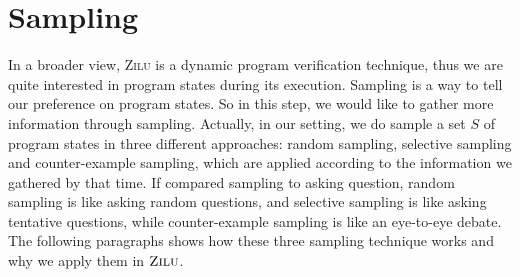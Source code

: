 
\section{Sampling} %
\label{sec:sampling}
In a broader view, \textsc{Zilu} is a dynamic program verification technique, 
thus we are quite interested in program states during its execution.
Sampling is a way to tell our preference on program states. 
So in this step, we would like to gather more information through sampling.
Actually, in our setting, we do sample a set $S$ of program states in three different approaches: 
random sampling, selective sampling and counter-example sampling, 
which are applied according to the information we gathered by that time.
If compared sampling to asking question, random sampling is like asking random questions,
and selective sampling is like asking tentative questions, 
while counter-example sampling is like an eye-to-eye debate.
The following paragraphs shows how these three sampling technique works and why we apply them in $\textsc{Zilu}$.


